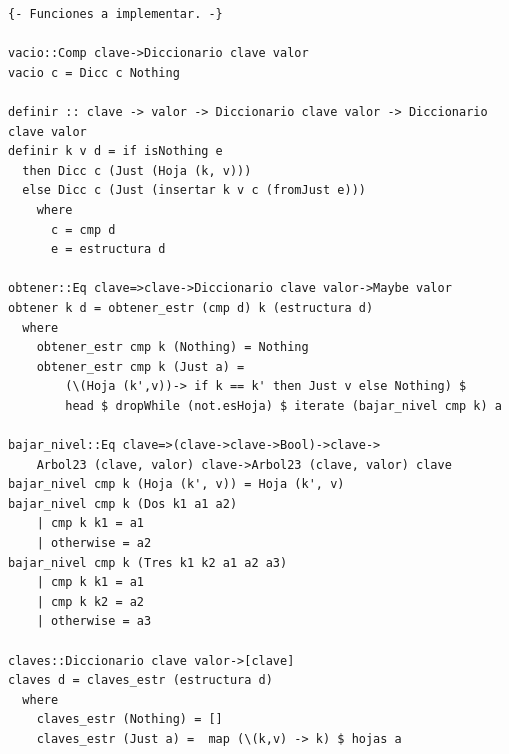\documentclass[a4paper]{article}
\begin{document}
\begin{verbatim}
{- Funciones a implementar. -}

vacio::Comp clave->Diccionario clave valor
vacio c = Dicc c Nothing

definir :: clave -> valor -> Diccionario clave valor -> Diccionario clave valor
definir k v d = if isNothing e
  then Dicc c (Just (Hoja (k, v)))
  else Dicc c (Just (insertar k v c (fromJust e)))
    where
      c = cmp d
      e = estructura d

obtener::Eq clave=>clave->Diccionario clave valor->Maybe valor
obtener k d = obtener_estr (cmp d) k (estructura d)
  where
    obtener_estr cmp k (Nothing) = Nothing
    obtener_estr cmp k (Just a) =
        (\(Hoja (k',v))-> if k == k' then Just v else Nothing) $
        head $ dropWhile (not.esHoja) $ iterate (bajar_nivel cmp k) a

bajar_nivel::Eq clave=>(clave->clave->Bool)->clave->
    Arbol23 (clave, valor) clave->Arbol23 (clave, valor) clave
bajar_nivel cmp k (Hoja (k', v)) = Hoja (k', v)
bajar_nivel cmp k (Dos k1 a1 a2)
    | cmp k k1 = a1
    | otherwise = a2
bajar_nivel cmp k (Tres k1 k2 a1 a2 a3)
    | cmp k k1 = a1
    | cmp k k2 = a2
    | otherwise = a3

claves::Diccionario clave valor->[clave]
claves d = claves_estr (estructura d)
  where
    claves_estr (Nothing) = []
    claves_estr (Just a) =  map (\(k,v) -> k) $ hojas a
\end{verbatim}
\end{document}
